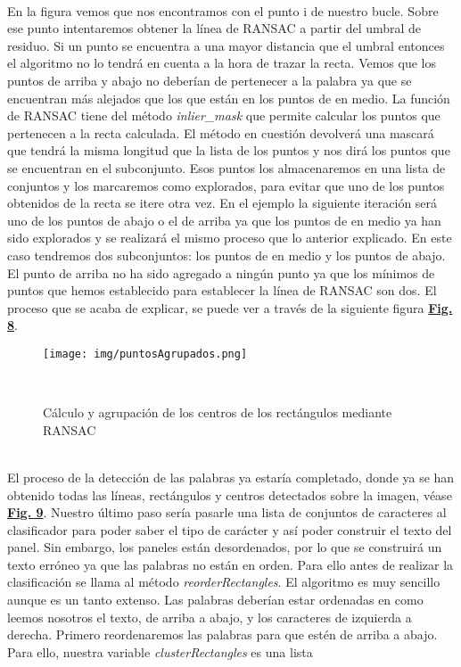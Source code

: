 \documentclass[a4paper, 12pt]{article}
\begin{document}
\\ En la figura vemos que nos encontramos con el punto i de nuestro bucle. Sobre ese punto intentaremos obtener la línea de RANSAC a partir del umbral de residuo. Si un punto se encuentra a una mayor distancia que el umbral entonces el algoritmo no lo tendrá en cuenta a la hora de trazar la recta. Vemos que los puntos de arriba y abajo no deberían de pertenecer a la palabra ya que se encuentran más alejados que los que están en los puntos de en medio. La función de RANSAC tiene del método \textit{inlier\_mask} que permite calcular los puntos que pertenecen a la recta calculada. El método en cuestión devolverá una mascará que tendrá la misma longitud que la lista de los puntos y nos dirá  los puntos que se encuentran en el subconjunto. Esos puntos los almacenaremos en una lista de conjuntos y los marcaremos como explorados, para evitar que uno de los puntos obtenidos de la recta se itere otra vez. En el ejemplo la siguiente iteración será uno de los puntos de abajo o el de arriba ya que los puntos de en medio ya han sido explorados y se realizará el mismo proceso que lo anterior explicado. En este caso tendremos dos subconjuntos: los puntos de en medio y los puntos de abajo. El punto de arriba no ha sido agregado a ningún punto ya que los mínimos de puntos que hemos establecido para establecer la línea de RANSAC son dos. El proceso que se acaba de explicar, se puede ver a través de la siguiente figura \textbf{\hyperref[fig:puntosAgrupados]{Fig. 8}}.
\begin{figure}[h]
	\centering
	\texttt{[image: img/puntosAgrupados.png]}
 	\caption{Cálculo y agrupación de los centros de los rectángulos mediante RANSAC}\
	\label{fig:puntosAgrupados}
\end{figure}
\\El proceso de la detección de las palabras ya estaría completado, donde ya se han obtenido todas las líneas, rectángulos y centros detectados sobre la imagen, véase \textbf{\hyperref[fig:imagenDetectada]{Fig. 9}}. Nuestro último paso sería pasarle una lista de conjuntos de caracteres al clasificador para poder saber el tipo de carácter y así poder construir el texto del panel. Sin embargo, los paneles están desordenados, por lo que se construirá un texto erróneo ya que las palabras no están en orden. Para ello antes de realizar la clasificación se llama al método \textit{reorderRectangles}. El algoritmo es muy sencillo aunque es un tanto extenso. Las palabras deberían estar ordenadas en como leemos nosotros el texto, de arriba a abajo, y los caracteres de izquierda a derecha. Primero reordenaremos las palabras para que estén de arriba a abajo. Para ello, nuestra variable \textit{clusterRectangles} es una lista 
\end{document}
